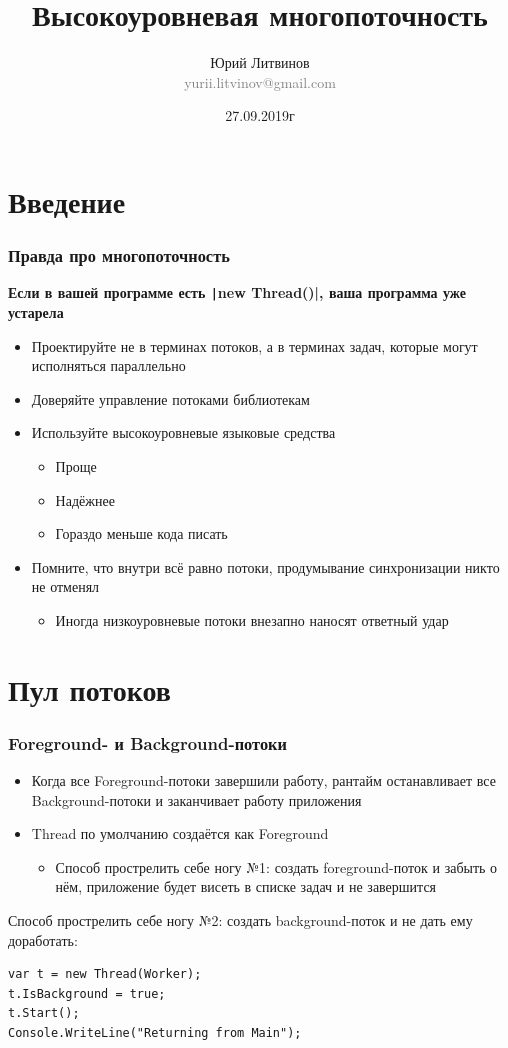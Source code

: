 \documentclass[xetex,mathserif,serif]{beamer}
\title{Высокоуровневая многопоточность}
\author[Юрий Литвинов]{Юрий Литвинов\\\small{\textcolor{gray}{yurii.litvinov@gmail.com}}}
\date{27.09.2019г}
\begin{document}
	\frame{\titlepage}

	\section{Введение}

	\begin{frame}
		\frametitle{Правда про многопоточность}
		\textbf{Если в вашей программе есть \texttt|new Thread()|, ваша программа уже устарела}
		\begin{itemize}
			\item Проектируйте не в терминах потоков, а в терминах задач, которые могут исполняться параллельно
			\item Доверяйте управление потоками библиотекам
			\item Используйте высокоуровневые языковые средства
			\begin{itemize}
				\item Проще
				\item Надёжнее
				\item Гораздо меньше кода писать
			\end{itemize}
			\item Помните, что внутри всё равно потоки, продумывание синхронизации никто не отменял
			\begin{itemize}
				\item Иногда низкоуровневые потоки внезапно наносят ответный удар
			\end{itemize}
		\end{itemize}
	\end{frame}

	\section{Пул потоков}

	\begin{frame}[fragile]
		\frametitle{Foreground- и Background-потоки}
		\begin{itemize}
			\item Когда все Foreground-потоки завершили работу, рантайм останавливает все Background-потоки и заканчивает работу приложения
			\item Thread по умолчанию создаётся как Foreground
			\begin{itemize}
				\item Способ прострелить себе ногу №1: создать foreground-поток и забыть о нём, приложение будет висеть в списке задач и не завершится
			\end{itemize}
		\end{itemize}
		\vspace{5mm}
		Способ прострелить себе ногу №2: создать background-поток и не дать ему доработать:
		\begin{verbatim}
var t = new Thread(Worker);
t.IsBackground = true;
t.Start();
Console.WriteLine("Returning from Main");
		\end{verbatim}
	\end{frame}
\end{document}
